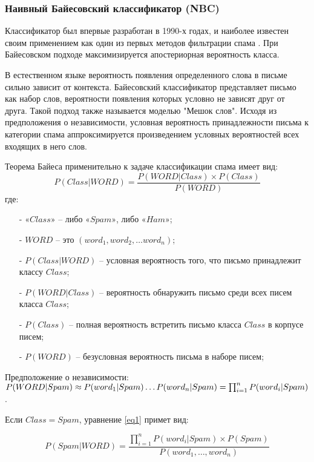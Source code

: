 \subsubsection{Наивный Байесовский классификатор (NBC)}
Классификатор был впервые разработан в 1990-х годах, и наиболее известен 
своим применением как один из первых методов фильтрации спама \cite{Bayes}.
При Байесовском подходе максимизируется апостериорная вероятность класса.

В естественном языке вероятность появления определенного слова в письме 
сильно зависит от контекста. Байесовский классификатор представляет письмо 
как набор слов, вероятности появления которых условно не зависят друг от друга. 
Такой подход также называется моделью "Мешок слов". 
Исходя из предположения о независимости, условная вероятность принадлежности 
письма к категории спама аппроксимируется произведением условных 
вероятностей всех входящих в него слов.

Теорема Байеса применительно к задаче классификации спама имеет вид:
\begin{equation}\label{eq1}
    P(Class | WORD) = \frac{P(WORD | Class) \times P(Class)}{P(WORD)}
\end{equation}
где:
\begin{itemize}
    \item[-] ${«Class»}$ -- либо ${«Spam»}$, либо ${«Ham»}$;
    \item[-] ${WORD}$ -- это $({word_1}, {word_2}, \dots {word_n})$;
    \item[-] ${P(Class | WORD)}$ -- условная вероятность того, что письмо принадлежит классу ${Class}$;
    \item[-] ${P(WORD | Class)}$ -- вероятность обнаружить письмо среди всех писем класса ${Class}$;
    \item[-] ${P(Class)}$ -- полная вероятность встретить письмо класса ${Class}$ в корпусе писем;
    \item[-] ${P(WORD)}$ -- безусловная вероятность письма в наборе писем;
\end{itemize}

Предположение о независимости:
$P(WORD | Spam) \approx P(word_1 | Spam) \dots \\ P(word_n | Spam) = \prod_{i=1}^n P(word_i | Spam)$.

Если ${Class = Spam}$, уравнение \eqref{eq1} примет вид:


\begin{equation}\label{eq3}
    P(Spam | WORD) = \frac {\prod_{i=1}^n P(word_i | Spam) \times P(Spam)} {P(word_1, \dots ,word_n)}
\end{equation}


